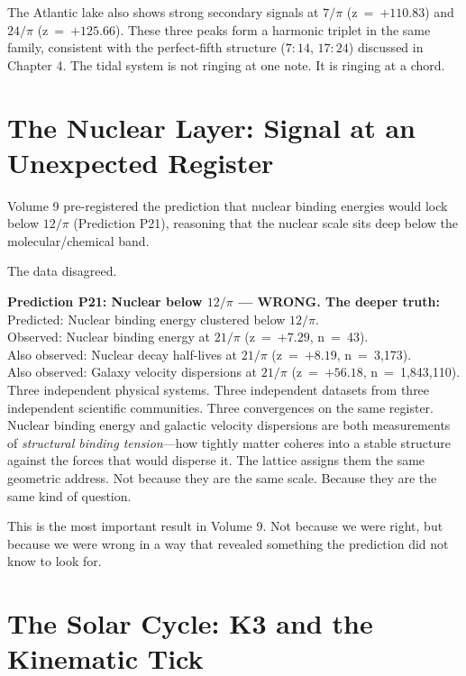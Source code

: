 \documentclass[11pt, letterpaper, openany]{book}
\begin{document}
The Atlantic lake also shows strong secondary signals at $7/\pi$ (z~=~$+110.83$)
and $24/\pi$ (z~=~$+125.66$). These three peaks form a harmonic triplet in the same
family, consistent with the perfect-fifth structure ($7:14$, $17:24$) discussed in
Chapter 4. The tidal system is not ringing at one note. It is ringing at a chord.

\section{The Nuclear Layer: Signal at an Unexpected Register}

Volume 9 pre-registered the prediction that nuclear binding energies would lock
below $12/\pi$ (Prediction P21), reasoning that the nuclear scale sits deep below
the molecular/chemical band.

The data disagreed.

\begin{wrongbox}
\textbf{Prediction P21: Nuclear below $12/\pi$ --- WRONG. The deeper truth:}\\[0.5em]
Predicted: Nuclear binding energy clustered below $12/\pi$.\\
Observed: Nuclear binding energy at $21/\pi$ (z~=~$+7.29$, n~=~43).\\
Also observed: Nuclear decay half-lives at $21/\pi$ (z~=~$+8.19$, n~=~3,173).\\
Also observed: Galaxy velocity dispersions at $21/\pi$ (z~=~$+56.18$, n~=~1,843,110).\\[0.5em]
Three independent physical systems. Three independent datasets from three
independent scientific communities. Three convergences on the same register.\\[0.5em]
Nuclear binding energy and galactic velocity dispersions are both measurements of
\emph{structural binding tension}---how tightly matter coheres into a stable
structure against the forces that would disperse it. The lattice assigns them the
same geometric address. Not because they are the same scale. Because they are the
same kind of question.
\end{wrongbox}

This is the most important result in Volume 9. Not because we were right, but
because we were wrong in a way that revealed something the prediction did not know
to look for.

\section{The Solar Cycle: K3 and the Kinematic Tick}
\end{document}
